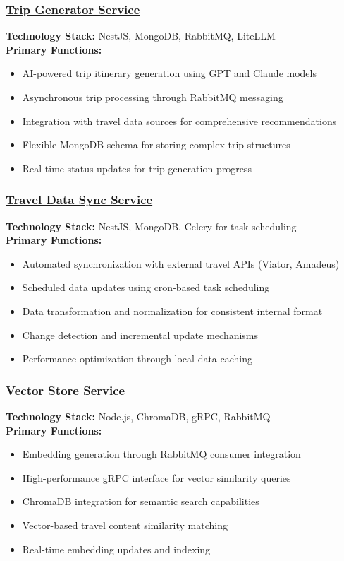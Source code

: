 \subsubsection*{\underline{Trip Generator Service}}
\textbf{Technology Stack:} NestJS, MongoDB, RabbitMQ, LiteLLM\\
\textbf{Primary Functions:}
\begin{itemize}
    \item AI-powered trip itinerary generation using GPT and Claude models
    \item Asynchronous trip processing through RabbitMQ messaging
    \item Integration with travel data sources for comprehensive recommendations
    \item Flexible MongoDB schema for storing complex trip structures
    \item Real-time status updates for trip generation progress
\end{itemize}

\subsubsection*{\underline{Travel Data Sync Service}}
\textbf{Technology Stack:} NestJS, MongoDB, Celery for task scheduling\\
\textbf{Primary Functions:}
\begin{itemize}
    \item Automated synchronization with external travel APIs (Viator, Amadeus)
    \item Scheduled data updates using cron-based task scheduling
    \item Data transformation and normalization for consistent internal format
    \item Change detection and incremental update mechanisms
    \item Performance optimization through local data caching
\end{itemize}

\subsubsection*{\underline{Vector Store Service}}
\textbf{Technology Stack:} Node.js, ChromaDB, gRPC, RabbitMQ\\
\textbf{Primary Functions:}
\begin{itemize}
    \item Embedding generation through RabbitMQ consumer integration
    \item High-performance gRPC interface for vector similarity queries
    \item ChromaDB integration for semantic search capabilities
    \item Vector-based travel content similarity matching
    \item Real-time embedding updates and indexing
\end{itemize}


